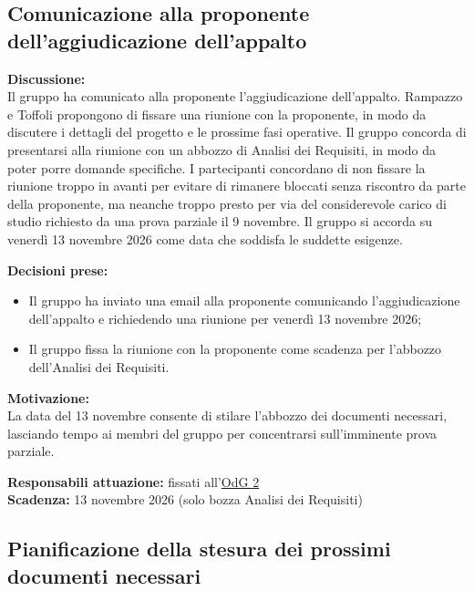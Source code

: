 \documentclass[12pt,a4paper]{article}
\newcommand{\tightlist}{\setlength{\itemsep}{1pt}\setlength{\parskip}{0pt}}
\begin{document}
\hypertarget{odg-1}{%
\subsection{Comunicazione alla proponente dell'aggiudicazione dell'appalto}}

\textbf{Discussione:} \\
Il gruppo ha comunicato alla proponente l'aggiudicazione dell'appalto.
Rampazzo e Toffoli propongono di fissare una riunione con la proponente, in modo da discutere i dettagli del progetto e le prossime fasi operative.
Il gruppo concorda di presentarsi alla riunione con un abbozzo di Analisi dei Requisiti, in modo da poter porre domande specifiche.
I partecipanti concordano di non fissare la riunione troppo in avanti per evitare di rimanere bloccati senza riscontro da parte della proponente, ma neanche troppo presto per via del considerevole carico di studio richiesto da una prova parziale il 9 novembre.
Il gruppo si accorda su venerdì 13 novembre 2026 come data che soddisfa le suddette esigenze.

\textbf{Decisioni prese:}
\begin{itemize}
\tightlist
\item[$\checkmark$] Il gruppo ha inviato una email alla proponente comunicando l'aggiudicazione dell'appalto e richiedendo una riunione per venerdì 13 novembre 2026;
\item[$\checkmark$] Il gruppo fissa la riunione con la proponente come scadenza per l'abbozzo dell'Analisi dei Requisiti.
\end{itemize}

\textbf{Motivazione:} \\
La data del 13 novembre consente di stilare l'abbozzo dei documenti necessari, lasciando tempo ai membri del gruppo per concentrarsi sull'imminente prova parziale.

\textbf{Responsabili attuazione:} fissati all'\hyperlink{odg-2}{OdG 2} \\
\textbf{Scadenza:} 13 novembre 2026 (solo bozza Analisi dei Requisiti)

\hypertarget{odg-2}{%
\subsection{Pianificazione della stesura dei prossimi documenti necessari}}
\end{document}
